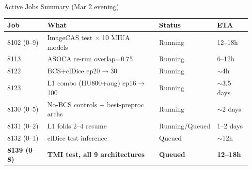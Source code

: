 \documentclass[aspectratio=169,10pt]{beamer}
\begin{document}
\begin{frame}{Active Jobs Summary (Mar 2 evening)}

\centering
\scriptsize
\begin{tabular}{l l l l}
\toprule
\textbf{Job} & \textbf{What} & \textbf{Status} & \textbf{ETA} \\
\midrule
8102 (0--9) & ImageCAS test $\times$ 10 MIUA models & Running & 12--18h \\
8113 & ASOCA re-run overlap=0.75 & Running & 6--12h \\
8122 & BCS+clDice ep20$\to$30 & Running & $\sim$4h \\
8123 & L1 combo (HU800+aug) ep16$\to$100 & Running & $\sim$3.5 days \\
8130 (0--5) & No-BCS controls + best-preproc archs & Running & $\sim$2 days \\
8131 (0--2) & L1 folds 2--4 resume & Running/Queued & 1--2 days \\
8132 (0--1) & clDice test inference & Queued & $\sim$12h \\
\textbf{8139 (0--8)} & \textbf{TMI test, all 9 architectures} & \textbf{Queued} & \textbf{12--18h} \\
\bottomrule
\end{tabular}

\end{frame}
\end{document}
